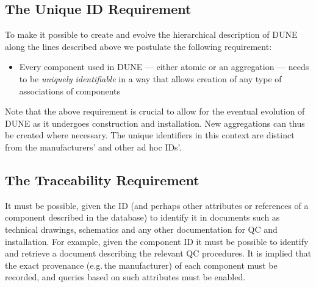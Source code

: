 \documentclass[pdftex,12pt,letter]{article}
\begin{document}
\subsection{The Unique ID Requirement}

To make it possible to create and evolve the hierarchical description of DUNE along the lines described above
we postulate the following requirement:

\begin{itemize}

\item Every component used in DUNE ---  either atomic or an aggregation --- needs to be \textit{uniquely identifiable} in a way that allows
creation of any type of associations of components

\end{itemize}


\noindent Note that the above requirement is crucial to allow for the eventual evolution of DUNE as it undergoes construction and installation.
New aggregations can thus be created where necessary. The unique identifiers in this context are distinct from the manufacturers' and other ad hoc IDs'.




\subsection{The Traceability Requirement}

It must be possible, given the ID (and perhaps other attributes or references of a component described in the database)
to identify it in documents such as technical drawings, schematics and any other documentation for QC and installation.
For example, given the component ID it must be possible to identify and retrieve a document describing the relevant QC
procedures. It is implied that the exact provenance (e.g.\,the manufacturer) of each component must be recorded, and
queries based on such attributes must be enabled.

\end{document}

